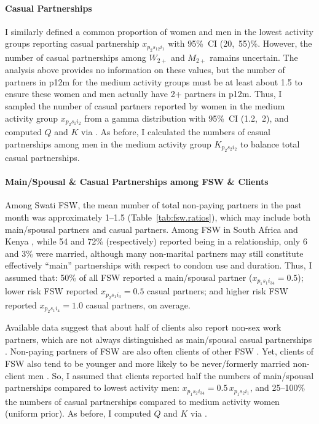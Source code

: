 \paragraph{Casual Partnerships}
I similarly defined a common proportion of women and men in the lowest activity groups
reporting casual partnership $x_{p_{2}s_{12}i_{1}}$ with 95\%~CI (20,~55)\%.
However, the number of casual partnerships among $W_{2+}$ and $M_{2+}$ ramains uncertain.
The analysis above provides no information on these values,
but the number of partners in p12m for the medium activity groups must be at least about 1.5
to ensure these women and men actually have 2+ partners in p12m.
Thus, I sampled the number of casual partners reported by women in the medium activity group
$x_{p_{2}s_{1}i_{2}}$ from a gamma distribution with 95\%~CI (1.2,~2),
and computed $Q$ and $K$ via .
As before, I calculated the numbers of casual partnerships among men in the medium activity group
$K_{p_{2}s_{2}i_{2}}$ to balance total casual partnerships.
\paragraph{Main/Spousal \& Casual Partnerships among FSW \& Clients}
Among Swati FSW, the mean number of total non-paying partners in the past month was
approximately 1--1.5 (Table~\ref{tab:fsw.ratios}),
which may include both main/spousal partners and casual partners.
Among FSW in South Africa \cite{Wells2018} and Kenya \cite{Voeten2007},
while 54 and 72\% (respectively) reported being in a relationship, only 6 and 3\% were married,
although many non-marital partners may still constitute effectively ``main'' partnerships
with respect to condom use and duration.
Thus, I assumed that:
50\% of all FSW reported a main/spousal partner (\ie $x_{p_{1}s_{1}i_{34}} = 0.5$);
lower risk FSW reported $x_{p_{2}s_{1}i_{3}} = 0.5$ casual partners; and
higher risk FSW reported $x_{p_{2}s_{1}i_{4}} = 1.0$ casual partners, on average.
\par
Available data suggest that about half of clients also report non-sex work partners,
which are not always distinguished as main/spousal \vs casual partnerships
\cite{Lowndes2000,Santo2005}.
Non-paying partners of FSW are also often clients of other FSW \cite{Voeten2007,Godin2008}.
Yet, clients of FSW also tend to be younger and more likely to be
never/formerly married \vs non-client men \cite{Lowndes2000,Carael2006}.
So, I assumed that clients reported
half the numbers of main/spousal partnerships compared to lowest activity men:
$x_{p_{1}s_{2}i_{34}} = 0.5\,x_{p_{1}s_{2}i_{1}}$, and
25--100\% the numbers of casual partnerships compared to medium activity women (uniform prior).
As before, I computed $Q$ and $K$ via .
